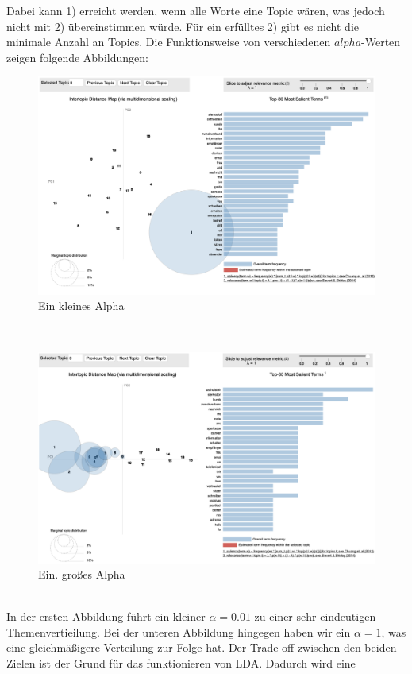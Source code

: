\documentclass[german,version-2020-11]{uzl-thesis}
\begin{document}
Dabei kann 1) erreicht werden, wenn alle Worte eine Topic wären, was jedoch nicht mit 2) übereinstimmen würde. Für ein erfülltes 2) gibt es nicht die minimale Anzahl an Topics. Die Funktionsweise von verschiedenen $alpha$-Werten zeigen folgende Abbildungen: 
\\
\begin{figure}[h]
\begin{center}
\includegraphics[scale=0.3]{lda_alpha001.png}
\end{center}
\caption{Ein kleines Alpha} 
\end{figure}\\
\begin{figure}[h]
\begin{center}
\includegraphics[scale=0.3]{lda_alpha1.png}
\caption{Ein. großes Alpha}
\end{center}
\end{figure}\\
In der ersten Abbildung führt ein kleiner $\alpha = 0.01$ zu einer sehr eindeutigen Themenvertieilung. Bei der unteren Abbildung hingegen haben wir ein $\alpha = 1$, was eine gleichmäßigere Verteilung zur Folge hat. Der Trade-off zwischen den beiden Zielen ist der Grund für das funktionieren von LDA. Dadurch wird eine
\end{document}
